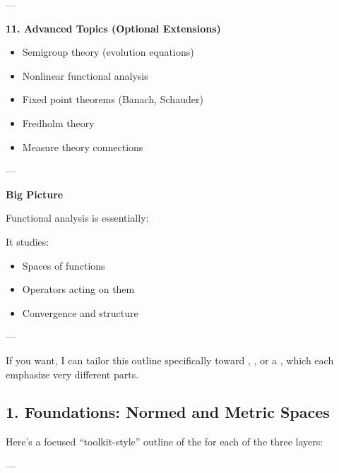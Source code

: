 \documentclass[12pt,a4paper]{report}
\begin{document}
\begin{description}
---

\item \textbf{11. Advanced Topics (Optional Extensions)}

\begin{itemize}
    \item Semigroup theory (evolution equations)
    \item Nonlinear functional analysis
    \item Fixed point theorems (Banach, Schauder)
    \item Fredholm theory
    \item Measure theory connections
\end{itemize}

---

\item \textbf{Big Picture}

Functional analysis is essentially:


It studies:

\begin{itemize}
    \item Spaces of functions
    \item Operators acting on them
    \item Convergence and structure
\end{itemize}

---
\end{description}

If you want, I can tailor this outline specifically toward , , or a , which each emphasize very different parts.

\newpage

\subsection*{1. Foundations: Normed and Metric Spaces}

Here’s a focused “toolkit-style” outline of the  for each of the three layers:

---
\end{document}
